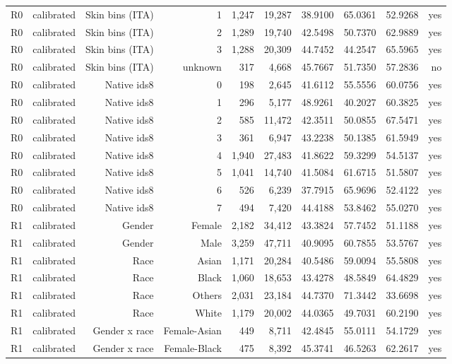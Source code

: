 \documentclass[10pt]{article}
\begin{document}
\begin{longtable}{@{}lrrrrrrrrr@{}}
R0 & calibrated & Skin bins (ITA) & 1 & 1,247 & 19,287 & 38.9100 & 65.0361 & 52.9268 & yes \\
R0 & calibrated & Skin bins (ITA) & 2 & 1,289 & 19,740 & 42.5498 & 50.7370 & 62.9889 & yes \\
R0 & calibrated & Skin bins (ITA) & 3 & 1,288 & 20,309 & 44.7452 & 44.2547 & 65.5965 & yes \\
R0 & calibrated & Skin bins (ITA) & unknown & 317 & 4,668 & 45.7667 & 51.7350 & 57.2836 & no \\
R0 & calibrated & Native ids8 & 0 & 198 & 2,645 & 41.6112 & 55.5556 & 60.0756 & yes \\
R0 & calibrated & Native ids8 & 1 & 296 & 5,177 & 48.9261 & 40.2027 & 60.3825 & yes \\
R0 & calibrated & Native ids8 & 2 & 585 & 11,472 & 42.3511 & 50.0855 & 67.5471 & yes \\
R0 & calibrated & Native ids8 & 3 & 361 & 6,947 & 43.2238 & 50.1385 & 61.5949 & yes \\
R0 & calibrated & Native ids8 & 4 & 1,940 & 27,483 & 41.8622 & 59.3299 & 54.5137 & yes \\
R0 & calibrated & Native ids8 & 5 & 1,041 & 14,740 & 41.5084 & 61.6715 & 51.5807 & yes \\
R0 & calibrated & Native ids8 & 6 & 526 & 6,239 & 37.7915 & 65.9696 & 52.4122 & yes \\
R0 & calibrated & Native ids8 & 7 & 494 & 7,420 & 44.4188 & 53.8462 & 55.0270 & yes \\
R1 & calibrated & Gender & Female & 2,182 & 34,412 & 43.3824 & 57.7452 & 51.1188 & yes \\
R1 & calibrated & Gender & Male & 3,259 & 47,711 & 40.9095 & 60.7855 & 53.5767 & yes \\
R1 & calibrated & Race & Asian & 1,171 & 20,284 & 40.5486 & 59.0094 & 55.5808 & yes \\
R1 & calibrated & Race & Black & 1,060 & 18,653 & 43.4278 & 48.5849 & 64.4829 & yes \\
R1 & calibrated & Race & Others & 2,031 & 23,184 & 44.7370 & 71.3442 & 33.6698 & yes \\
R1 & calibrated & Race & White & 1,179 & 20,002 & 44.0365 & 49.7031 & 60.2190 & yes \\
R1 & calibrated & Gender x race & Female-Asian & 449 & 8,711 & 42.4845 & 55.0111 & 54.1729 & yes \\
R1 & calibrated & Gender x race & Female-Black & 475 & 8,392 & 45.3741 & 46.5263 & 62.2617 & yes \\

\end{longtable}
\end{document}
